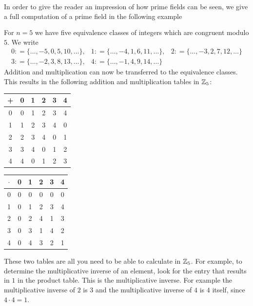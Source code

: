 In order to give the reader an impression of how prime fields can be seen, we give a full computation of a prime field in the following example
\begin{example} 
\label{primkoerper_z_5}
For $ n = 5 $ we have five equivalence classes of integers which are congruent modulo $ 5 $. We write
$$
\begin{array}{ccc}
0: = \{\ldots, -5,0,5,10, \ldots \}, &
1: = \{\ldots, -4,1,6,11, \ldots \}, &
2: = \{\ldots, -3,2,7,12, \ldots \} \\
3: = \{\ldots, -2,3,8,13, \ldots \}, &
4: = \{\ldots, -1,4,9,14, \ldots \}
\end{array}
$$
Addition and multiplication can now be transferred to the equivalence classes. This results in the following addition and multiplication tables in $ \mathbb{Z}_5 $:
\begin{center}
  \begin{tabular}{c | c c c c c}
    + & 0 & 1 & 2 & 3 & 4 \\\hline
    0 & 0 & 1 & 2 & 3 & 4 \\
    1 & 1 & 2 & 3 & 4 & 0 \\
    2 & 2 & 3 & 4 & 0 & 1 \\
    3 & 3 & 4 & 0 & 1 & 2 \\
    4 & 4 & 0 & 1 & 2 & 3 \\
  \end{tabular} \quad \quad \quad \quad
  \begin{tabular}{c | c c c c c}
$ \cdot $ & 0 & 1 & 2 & 3 & 4 \\\hline
      0 & 0 & 0 & 0 & 0 & 0 \\
      1 & 0 & 1 & 2 & 3 & 4 \\
      2 & 0 & 2 & 4 & 1 & 3 \\
      3 & 0 & 3 & 1 & 4 & 2 \\
      4 & 0 & 4 & 3 & 2 & 1 \\
  \end{tabular}
\end{center}

These two tables are all you need to be able to calculate in $ \mathbb{Z}_5 $. For example, to determine the multiplicative inverse of an element, look for the entry that results in $ 1 $ in the product table. This is the multiplicative inverse. For example the multiplicative inverse of $ 2 $ is $ 3 $ and the multiplicative inverse of $4$ is $4$ itself, since $4\cdot 4=1$.
\end{example}

